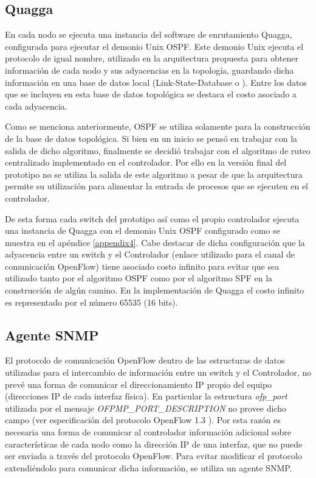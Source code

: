 \subsection{Quagga}
En cada nodo se ejecuta una instancia del software de enrutamiento Quagga, configurada para ejecutar el demonio Unix OSPF. Este demonio Unix ejecuta el protocolo de igual nombre, utilizado en la arquitectura propuesta para obtener información de cada nodo y sus adyacencias en la topolog\'ia, guardando dicha información en una base de datos local (Link-State-Database o ). Entre los datos que se incluyen en esta base de datos topol\'ogica se destaca el costo asociado a cada adyacencia.

Como se menciona anteriormente, OSPF se utiliza solamente para la construcci\'on de la base de datos topol\'ogica. Si bien en un inicio se pensó en trabajar con la salida de dicho algoritmo, finalmente se decidió trabajar con el algoritmo de ruteo centralizado implementado en el controlador. Por ello en la versi\'on final del prototipo no se utiliza la salida de este algoritmo a pesar de que la arquitectura permite su utilización para alimentar la entrada de procesos que se ejecuten en el controlador.

De esta forma cada switch del prototipo así como el propio controlador ejecuta una instancia de Quagga con el demonio Unix OSPF configurado como se muestra en el apéndice \ref{appendix4}. Cabe destacar de dicha configuración que la adyacencia entre un switch y el Controlador (enlace utilizado para el canal de comunicación OpenFlow) tiene asociado costo infinito para evitar que sea utilizado tanto por el algoritmo OSPF como por el algoritmo SPF en la construcción de algún camino. En la implementaci\'on de Quagga el costo infinito es representado por el n\'umero 65535 (16 bits).

\subsection{Agente SNMP}
El protocolo de comunicación OpenFlow dentro de las estructuras de datos utilizadas para el intercambio de información entre un switch y el Controlador, no prev\'e una forma de comunicar el direccionamiento IP propio del equipo (direcciones IP de cada interfaz física). En particular la estructura \textit{ofp\_port} utilizada por el mensaje \textit{OFPMP\_PORT\_DESCRIPTION} no provee dicho campo (ver especificación del protocolo OpenFlow 1.3 \citep{ofv133spec}). Por esta razón es necesaria una forma de comunicar al controlador información adicional sobre características de cada nodo como la dirección IP de una interfaz, que no puede ser enviada a través del protocolo OpenFlow. Para evitar modificar el protocolo extendiéndolo para comunicar dicha informaci\'on, se utiliza un agente SNMP.

